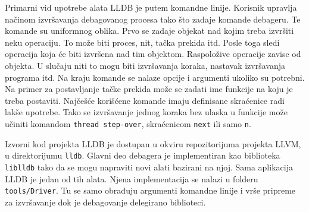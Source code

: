 \documentclass[12pt,oneside]{memoir}
\begin{document}
Primarni vid upotrebe alata LLDB je putem komandne linije.
Korisnik upravlja načinom izvršavanja debagovanog procesa tako što zadaje komande debageru.
Te komande su uniformnog oblika.
Prvo se zadaje objekat nad kojim treba izvršiti neku operaciju.
To može biti proces, nit, tačka prekida itd.
Posle toga sledi operacija koja će biti izvršena nad tim objektom.
Raspoložive operacije zavise od objekta.
U slučaju niti to mogu biti izvršavanja koraka, nastavak izvršavanja programa itd.
Na kraju komande se nalaze opcije i argumenti ukoliko su potrebni.
Na primer za postavljanje tačke prekida može se zadati ime funkcije na koju je treba postaviti.
Najčešće korišćene komande imaju definisane skraćenice radi lakše upotrebe.
Tako se izvršavanje jednog koraka bez ulaska u funkcije može učiniti komandom \verb|thread step-over|, skraćenicom \verb|next| ili samo \verb|n|.



Izvorni kod projekta LLDB je dostupan u okviru repozitorijuma projekta LLVM, u direktorijumu \verb|lldb|.
Glavni deo debagera je implementiran kao biblioteka \verb|liblldb| tako da se mogu napraviti novi alati bazirani na njoj.
Sama aplikacija LLDB je jedan od tih alata.
Njena implementacija se nalazi u folderu \verb|tools/Driver|.
Tu se samo obrađuju argumenti komandne linije i vrše pripreme za izvršavanje dok je debagovanje delegirano biblioteci.
\end{document}
